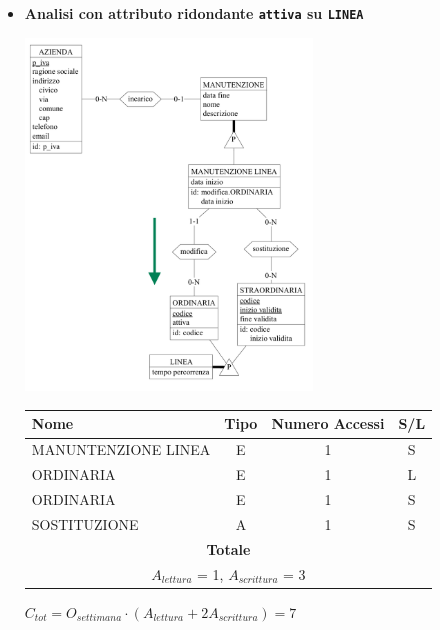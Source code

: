 \documentclass[12pt,a4paper]{report}
\begin{document}
\begin{enumerate}[label=\textbf{\arabic*)}]
	 \begin{itemize}
            \item \textbf{Analisi con attributo ridondante \texttt{attiva} su \texttt{LINEA}} \\
	\begin{center}
	\includegraphics[width=0.6\textwidth]{InserimentoVariazioneServizioRid}
	\end{center}
	\begin{table}[H]
	\centering
	\begin{tabular}{|l|c|c|c|}
	\hline
	Nome & Tipo & Numero Accessi & S/L \\
	\hline
	MANUNTENZIONE LINEA & E & 1 & S \\
	\hline
	ORDINARIA & E & 1 & L \\
	\hline
	ORDINARIA & E & 1 & S \\
	\hline
	SOSTITUZIONE & A & 1 & S \\
	\hline
	    \multicolumn{4}{c}{\textbf{Totale}} \\
	    \multicolumn{4}{c}{${A_{lettura}}$ = 1, ${A_{scrittura}}$ = 3} \\
	    \hline
	    \end{tabular}
	    \end{table}
	    \begin{center}
	    ${C_{tot} = {O_{settimana}}\cdot({A_{lettura}} + {2A_{scrittura}})= 7}$
	    \end{center}


\end{itemize}
\end{enumerate}
\end{document}
